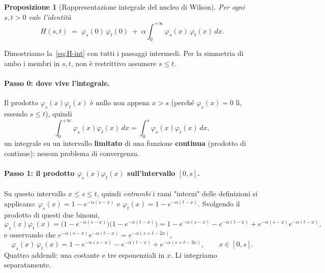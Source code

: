 \documentclass[11pt,a4paper]{article}
\theoremstyle{plain}
\newtheorem{proposizione}[teorema]{Proposizione}
\theoremstyle{definition}
\theoremstyle{remark}
\begin{document}
\begin{proposizione}[Rappresentazione integrale del nucleo di Wilson]
\label{prop:H-int}
Per ogni $s,t>0$ vale l'identità
\begin{equation}
  H(s,t) \;=\; \varphi_s(0)\,\varphi_t(0)
  \;+\; \alpha\!\int_0^{+\infty}\!\varphi_s(x)\,\varphi_t(x)\,dx .
  \label{eq:H-int}
\end{equation}
\end{proposizione}

Dimostriamo la~\eqref{eq:H-int} con tutti i passaggi intermedi. Per la simmetria di ambo i
membri in $s,t$, non è restrittivo assumere $s\le t$.

\paragraph{Passo 0: dove vive l'integrale.} Il prodotto $\varphi_s(x)\varphi_t(x)$ è nullo non
appena $x>s$ (perché $\varphi_s(x)=0$ lì, essendo $s\le t$), quindi
\[
  \int_0^{+\infty}\varphi_s(x)\varphi_t(x)\,dx = \int_0^{s}\varphi_s(x)\varphi_t(x)\,dx ,
\]
un integrale su un intervallo \textbf{limitato} di una funzione \textbf{continua} (prodotto di
continue): nessun problema di convergenza.

\paragraph{Passo 1: il prodotto $\varphi_s(x)\varphi_t(x)$ sull'intervallo $[0,s]$.} Su questo
intervallo $x\le s\le t$, quindi \emph{entrambi} i rami "interni" delle definizioni si
applicano: $\varphi_s(x)=1-e^{-\alpha(s-x)}$ e $\varphi_t(x)=1-e^{-\alpha(t-x)}$. Svolgendo il
prodotto di questi due binomi,
\[
  \varphi_s(x)\varphi_t(x)
  = \bigl(1-e^{-\alpha(s-x)}\bigr)\bigl(1-e^{-\alpha(t-x)}\bigr)
  = 1 - e^{-\alpha(s-x)} - e^{-\alpha(t-x)} + e^{-\alpha(s-x)}e^{-\alpha(t-x)} ,
\]
e osservando che $e^{-\alpha(s-x)}e^{-\alpha(t-x)}=e^{-\alpha(s+t-2x)}$,
\begin{equation}
  \varphi_s(x)\,\varphi_t(x) = 1 - e^{-\alpha(s-x)} - e^{-\alpha(t-x)} + e^{-\alpha(s+t-2x)},
  \qquad x\in[0,s].
  \label{eq:prodotto-espanso}
\end{equation}
Quattro addendi: una costante e tre esponenziali in $x$. Li integriamo separatamente.
\end{document}
